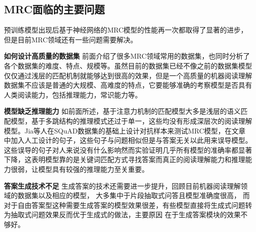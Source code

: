 




\subsection{MRC面临的主要问题}
预训练模型出现后基于神经网络的MRC模型的性能再一次都取得了显著的进步，但是目前MRC领域还有一些问题需要解决。

\textbf{如何设计高质量的数据集} \quad
前面介绍了很多MRC领域常用的数据集，也同时分析了各个数据集的难度、特点、规模等。虽然目前的数据集已经不像之前的数据集模型仅仅通过浅层的匹配机制就能够达到很高的效果，但是一个高质量的机器阅读理解数据集不应该是普通的大规模、高难度的特点，它要能够准确的考察模型是否具有人类阅读能力，包括推理能力，常识能力等。

\textbf{模型缺乏推理能力} \quad
如前面所述，基于注意力机制的匹配模型大多是浅层的语义匹配模型，基于多跳结构的推理模式还过于单一，这些均没有形成深层次的阅读理解模型。Jia等人在SQuAD数据集的基础上设计对抗样本来测试MRC模型，在文章中加入人工设计的句子，这些句子与问题相似但是与答案无关以此用来误导模型。这些误导的句子对人来说没有什么影响然而实验证明几乎所有模型的准确率都显著下降，这表明模型靠的是关键词匹配方式寻找答案而真正的阅读理解能力和推理能力很弱，让模型具有较强的推理能力至关重要。

\textbf{答案生成技术不足} \quad
生成答案的技术还需要进一步提升，回顾目前机器阅读理解领域的数据集以及相应的模型，
大多集中于片段抽取式问答且模型准确度很高，
而对于自由答案型这种需要生成答案的模型效果很差，有些模型直接将生成式问题转为抽取式问题效果反而优于生成式的做法，主要原因
在于生成答案模块的效果不够好。


























